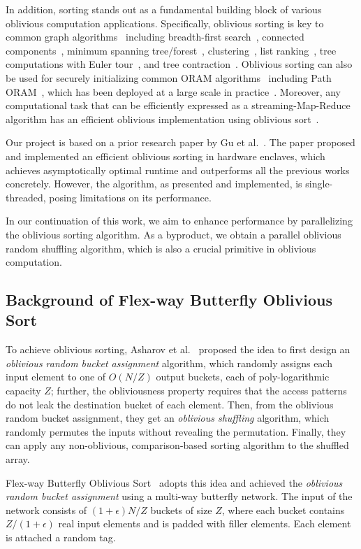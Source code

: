 \documentclass{article}
\begin{document}
In addition, sorting stands out as a fundamental building block of various oblivious computation applications. Specifically, oblivious sorting is
key to common
graph algorithms~\cite{oblivm,blantongraph,oram09} including
breadth-first search~\cite{oram09,blantongraph},
connected components~\cite{domulticore},
minimum spanning tree/forest~\cite{domulticore},
clustering~\cite{oblivm},
list ranking~\cite{domulticore}, tree computations with Euler tour~\cite{domulticore},
and tree contraction~\cite{domulticore}.
Oblivious sorting can also be used for securely initializing
common ORAM algorithms~\cite{enigmap} including
Path ORAM~\cite{pathoramjrnl}, which has been deployed at a large scale
in practice~\cite{signalpathoram}.
Moreover, any computational task
that can be efficiently expressed as a streaming-Map-Reduce algorithm
has an efficient
oblivious implementation using oblivious sort~\cite{oram09,oblivm}.

Our project is based on a prior research paper by Gu et al.~\cite{osort}. The paper proposed and implemented an efficient oblivious sorting in hardware enclaves, which achieves asymptotically optimal runtime and outperforms all the previous works concretely. However, the algorithm, as presented and implemented, is single-threaded, posing limitations on its performance.

In our continuation of this work, we aim to enhance performance by parallelizing the oblivious sorting algorithm. As a byproduct, we obtain a parallel oblivious random shuffling algorithm, which is also a crucial primitive in oblivious computation.

\subsection{Background of Flex-way Butterfly Oblivious Sort}
To achieve oblivious sorting, Asharov et al.~\cite{bucketsort} proposed the idea to first design an {\it oblivious random bucket assignment}
algorithm, which randomly assigns each
input element to one of $O(N/Z)$ output buckets, each of poly-logarithmic
capacity $Z$; further, the obliviousness property requires that
the access patterns do not leak the destination bucket of each element.
Then, from the oblivious random bucket assignment, they
get an {\it oblivious shuffling} algorithm,
which randomly permutes
the inputs without revealing the permutation. Finally,
they can apply any non-oblivious, comparison-based sorting algorithm to the shuffled array.

Flex-way Butterfly Oblivious Sort~\cite{osort} adopts this idea and achieved the {\it oblivious random bucket assignment} using a multi-way butterfly network. The input of the network consists of $(1+\epsilon)N/Z$ buckets of size $Z$, where each bucket contains $Z/(1+\epsilon)$ real input elements and is padded with filler elements. Each element is attached a random tag.
\end{document}
